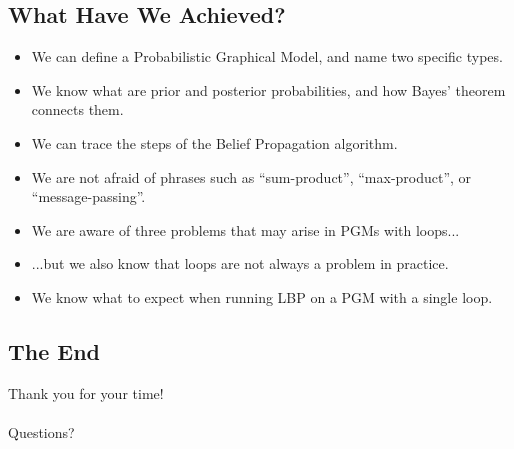 \documentclass{beamer}
\begin{document}
\subsection{What Have We Achieved?}
\begin{frame}
    \begin{itemize}[<+->]
        \item We can define a Probabilistic Graphical Model, and name two specific types.
        \item We know what are prior and posterior probabilities, and how Bayes' theorem connects them.
        \item We can trace the steps of the Belief Propagation algorithm.
        \item We are not afraid of phrases such as ``sum-product'', ``max-product'', or ``message-passing''.
        \item We are aware of three problems that may arise in PGMs with loops...
        \item ...but we also know that loops are not always a problem in practice.
        \item We know what to expect when running LBP on a PGM with a single loop.
    \end{itemize}
\end{frame}
\subsection{The End}
\begin{frame}
    \begin{center}
        \Huge{Thank you for your time!}\\~\\
        \LARGE{Questions?}
    \end{center}
\end{frame}
\end{document}
